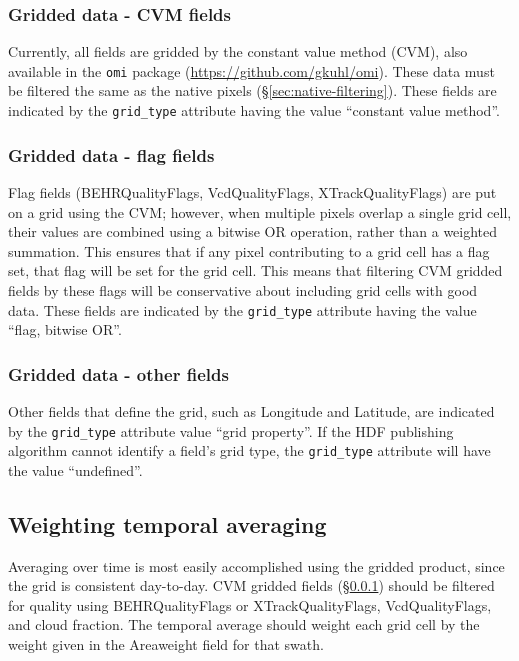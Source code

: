 \documentclass[12pt]{article}
\begin{document}
	
	\subsubsection{Gridded data - CVM fields}\label{sec:gridded:cvm}
	Currently, all fields are gridded by the constant value method (CVM), also available in the \lstinline$omi$ package (\url{https://github.com/gkuhl/omi}). These data must be filtered the same as the native pixels (\S\ref{sec:native-filtering}).  These fields are indicated by the \lstinline$grid_type$ attribute having the value ``constant value method''.
	
	\subsubsection{Gridded data - flag fields}
	Flag fields (BEHRQualityFlags, VcdQualityFlags, XTrackQualityFlags) are put on a grid using the CVM; however, when multiple pixels overlap a single grid cell, their values are combined using a bitwise OR operation, rather than a weighted summation. This ensures that if any pixel contributing to a grid cell has a flag set, that flag will be set for the grid cell. This means that filtering CVM gridded fields by these flags will be conservative about including grid cells with good data. These fields are indicated by the \lstinline$grid_type$ attribute having the value ``flag, bitwise OR''.
	
	\subsubsection{Gridded data - other fields}
	Other fields that define the grid, such as Longitude and Latitude, are indicated by the \lstinline$grid_type$ attribute value ``grid property''. If the HDF publishing algorithm cannot identify a field's grid type, the \lstinline$grid_type$ attribute will have the value ``undefined''.
	
	\subsection{Weighting temporal averaging}\label{sec:temporal-averaging}
	Averaging over time is most easily accomplished using the gridded product, since the grid is consistent day-to-day. CVM gridded fields (\S\ref{sec:gridded:cvm}) should be filtered for quality using BEHRQualityFlags or XTrackQualityFlags, VcdQualityFlags, and cloud fraction. The temporal average should weight each grid cell by the weight given in the Areaweight field for that swath.
	
\end{document}
